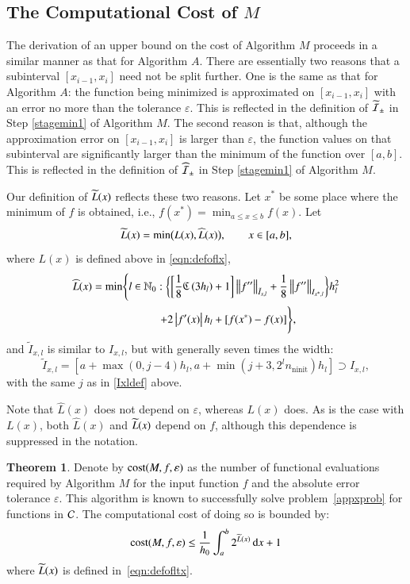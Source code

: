 \documentclass[review]{elsarticle}
\newcommand{\abstol}{\varepsilon}
\theoremstyle{definition}
\newcommand{\Ixl}{I_{x,l}}
\newcommand{\chL}{\widehat{L}}
\DeclareMathOperator{\ninit}{ninit}
\newtheorem{theorem}{Theorem}
\begin{document}
\subsection{The Computational Cost of $M$} \label{subsec:optcost}
The derivation of an upper bound on the cost of Algorithm $M$ proceeds in a
similar manner as that for Algorithm $A$. There are essentially two reasons that a
subinterval $[x_{i-1},x_i]$ need not be split further. One is the same as that
for Algorithm $A$: the function being minimized is approximated on
$[x_{i-1},x_i]$ with an error no more than the tolerance $\abstol$. This is 
reflected in the definition of $\widetilde{\mathcal{I}}_{\pm}$ in Step \ref{stagemin1} of Algorithm 
$M$.  The second
reason is that, although the approximation error on $[x_{i-1},x_i]$ is larger
than $\abstol$, the function values on that subinterval are significantly larger
than the minimum of the function over $[a,b]$.  This is reflected in the definition of 
$\widehat{\mathcal{I}}_{\pm}$ in Step \ref{stagemin1} of Algorithm $M$. 

Our definition of $\widetilde{L}(x)$ reflects these two reasons. Let $x^*$ be some place
where the minimum of $f$ is obtained, i.e.,
$f(x^*)  = \min_{a \le x \le b} f(x).$
Let
\begin{equation}\label{eqn:defofltx}
\tL(x) = \min\bigl(L(x),\chL(x)\bigr), \qquad x \in [a,b],
\end{equation}
where $L(x)$ is defined above in \eqref{eqn:defoflx}, 
\begin{multline}\label{eqn:defoflt1x}
\chL(x) = \min \Biggl\{ l \in \mathbb{N}_0 :  \biggl\{ \biggl[\frac 18 \fC\left(3h_l\right) + 1 
\biggr]   \norm[\tilde{I}_{x,l}]{f''} + \frac18\norm[{I_{x^*,l}}]{f''} \biggr\} h_{l}^2 \\ \qquad 
\qquad +  2 \abs{f'(x)} h_{l} + [f(x^*) - f(x)] \Biggr\},
\end{multline}
and $\tilde{I}_{x,l}$ is similar to $\Ixl$, but with generally seven times the width:
\begin{equation}
\tilde{I}_{x,l}=\left[a+\max(0,j-4)h_l, a+ \min(j+3,2^l n_{\ninit})h_l\right] \supset \Ixl,
\end{equation}
with the same $j$ as in \eqref{Ixldef} above. 


Note that $\chL(x)$ does not depend on $\abstol$, whereas $L(x)$ does. As is the
case with $L(x)$, both $\chL(x)$ and $\widetilde{L}(x)$ depend on $f$, although this
dependence is suppressed in the notation.

\begin{theorem}\label{thm:Mcost}
	Denote by $\cost(M,f,\abstol)$ as the number of functional evaluations required by 
	Algorithm $M$ for the input function $f$ and the absolute error tolerance $\abstol$.  
	This algorithm is known to successfully solve problem~\eqref{appxprob} for functions 
	in $\mathcal{C}$.  The computational cost of doing so is bounded by:
	\begin{equation*}
	\cost(M,f,\abstol) \le \frac{1}{h_0}\int_a^b 2^{\tL(x)} \, \dif x +1 \\
	\end{equation*}
	where $\widetilde{L}(x)$ is defined in~\eqref{eqn:defofltx}.
\end{theorem}
\end{document}
